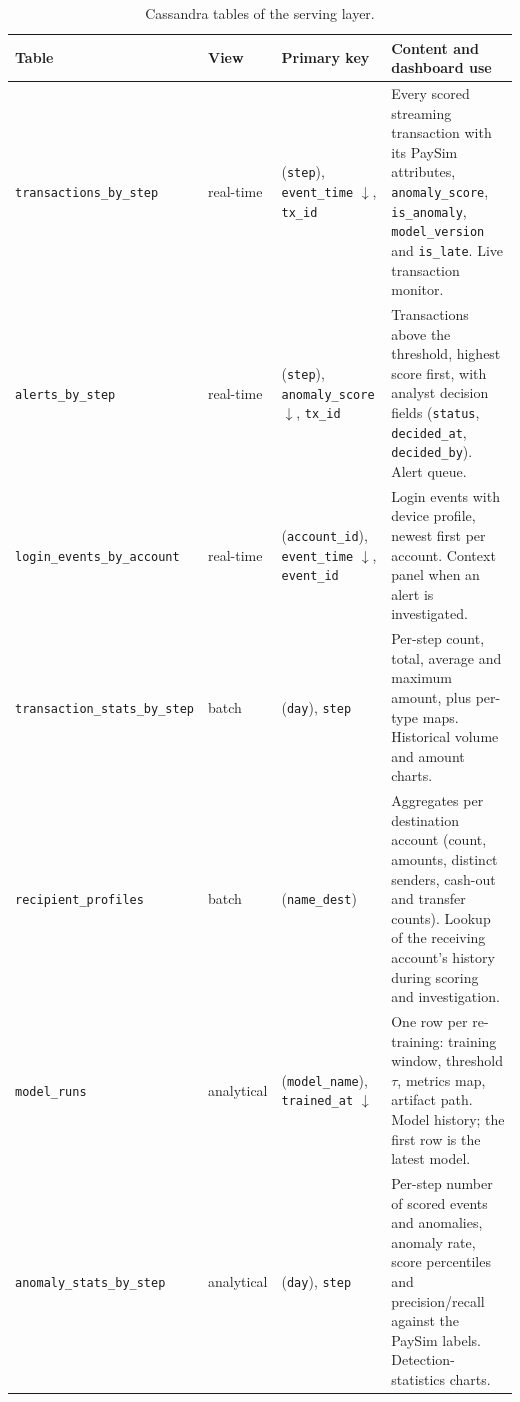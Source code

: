 \documentclass[titlepage]{article}
\begin{document}
\begin{table}[H]
    \centering
    \caption{Cassandra tables of the serving layer.}
    \label{tab:cassandra_tables}
    \small
    \renewcommand{\arraystretch}{1.3}
    \begin{tabularx}{\textwidth}{@{}l l >{\RaggedRight\arraybackslash}p{3.8cm} X@{}}
        \toprule
        \textbf{Table} & \textbf{View} & \textbf{Primary key} & \textbf{Content and dashboard use} \\
        \midrule
        \texttt{transactions\_by\_step} & real-time & (\texttt{step}), \texttt{event\_time} $\downarrow$, \texttt{tx\_id} & Every scored streaming transaction with its PaySim attributes, \texttt{anomaly\_score}, \texttt{is\_anomaly}, \texttt{model\_version} and \texttt{is\_late}. Live transaction monitor. \\
        \addlinespace
        \texttt{alerts\_by\_step} & real-time & (\texttt{step}), \texttt{anomaly\_score} $\downarrow$, \texttt{tx\_id} & Transactions above the threshold, highest score first, with analyst decision fields (\texttt{status}, \texttt{decided\_at}, \texttt{decided\_by}). Alert queue. \\
        \addlinespace
        \texttt{login\_events\_by\_account} & real-time & (\texttt{account\_id}), \texttt{event\_time} $\downarrow$, \texttt{event\_id} & Login events with device profile, newest first per account. Context panel when an alert is investigated. \\
        \addlinespace
        \texttt{transaction\_stats\_by\_step} & batch & (\texttt{day}), \texttt{step} & Per-step count, total, average and maximum amount, plus per-type maps. Historical volume and amount charts. \\
        \addlinespace
        \texttt{recipient\_profiles} & batch & (\texttt{name\_dest}) & Aggregates per destination account (count, amounts, distinct senders, cash-out and transfer counts). Lookup of the receiving account's history during scoring and investigation. \\
        \addlinespace
        \texttt{model\_runs} & analytical & (\texttt{model\_name}), \texttt{trained\_at} $\downarrow$ & One row per re-training: training window, threshold $\tau$, metrics map, artifact path. Model history; the first row is the latest model. \\
        \addlinespace
        \texttt{anomaly\_stats\_by\_step} & analytical & (\texttt{day}), \texttt{step} & Per-step number of scored events and anomalies, anomaly rate, score percentiles and precision/recall against the PaySim labels. Detection-statistics charts. \\
        \bottomrule
    \end{tabularx}
\end{table}
\end{document}
